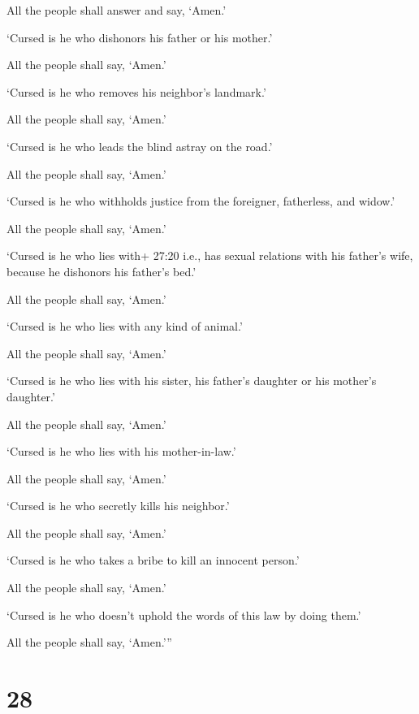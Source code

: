 All the people shall answer and say, `Amen.'

 `Cursed is he who dishonors his father or his mother.'

All the people shall say, `Amen.'

 `Cursed is he who removes his neighbor's landmark.'

All the people shall say, `Amen.'

 `Cursed is he who leads the blind astray on the road.'

All the people shall say, `Amen.'

 `Cursed is he who withholds justice from the foreigner,
fatherless, and widow.'

All the people shall say, `Amen.'

 `Cursed is he who lies with+ 27:20 i.e., has sexual
relations with his father's wife, because he dishonors his father's
bed.'

All the people shall say, `Amen.'

 `Cursed is he who lies with any kind of animal.'

All the people shall say, `Amen.'

 `Cursed is he who lies with his sister, his father's
daughter or his mother's daughter.'

All the people shall say, `Amen.'

 `Cursed is he who lies with his mother-in-law.'

All the people shall say, `Amen.'

 `Cursed is he who secretly kills his neighbor.'

All the people shall say, `Amen.'

 `Cursed is he who takes a bribe to kill an innocent
person.'

All the people shall say, `Amen.'

 `Cursed is he who doesn't uphold the words of this law by
doing them.'

All the people shall say, `Amen.'''

\hypertarget{section-27}{%
\section{28}\label{section-27}}

